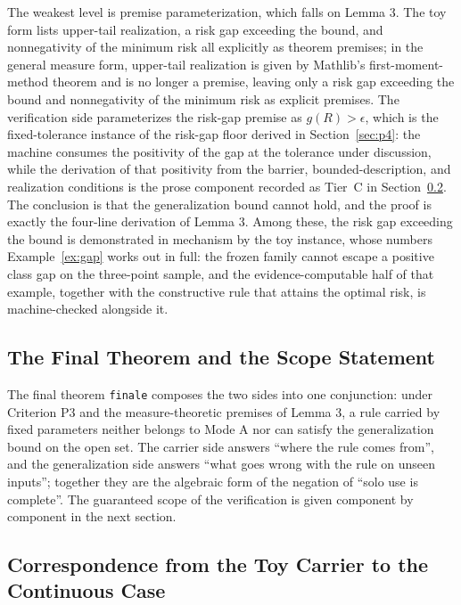 The weakest level is premise parameterization, which falls on Lemma 3. The toy form lists upper-tail realization, a risk gap exceeding the bound, and nonnegativity of the minimum risk all explicitly as theorem premises; in the general measure form, upper-tail realization is given by Mathlib's first-moment-method theorem and is no longer a premise, leaving only a risk gap exceeding the bound and nonnegativity of the minimum risk as explicit premises. The verification side parameterizes the risk-gap premise as $g(R) > \epsilon$, which is the fixed-tolerance instance of the risk-gap floor derived in Section~\ref{sec:p4}: the machine consumes the positivity of the gap at the tolerance under discussion, while the derivation of that positivity from the barrier, bounded-description, and realization conditions is the prose component recorded as Tier~C in Section~\ref{sec:layers}. The conclusion is that the generalization bound cannot hold, and the proof is exactly the four-line derivation of Lemma 3. Among these, the risk gap exceeding the bound is demonstrated in mechanism by the toy instance, whose numbers Example~\ref{ex:gap} works out in full: the frozen family cannot escape a positive class gap on the three-point sample, and the evidence-computable half of that example, together with the constructive rule that attains the optimal risk, is machine-checked alongside it.

\subsection{The Final Theorem and the Scope Statement}

The final theorem \texttt{finale} composes the two sides into one conjunction: under Criterion P3 and the measure-theoretic premises of Lemma 3, a rule carried by fixed parameters neither belongs to Mode A nor can satisfy the generalization bound on the open set. The carrier side answers ``where the rule comes from'', and the generalization side answers ``what goes wrong with the rule on unseen inputs''; together they are the algebraic form of the negation of ``solo use is complete''. The guaranteed scope of the verification is given component by component in the next section.

\subsection{Correspondence from the Toy Carrier to the Continuous Case}
\label{sec:layers}

